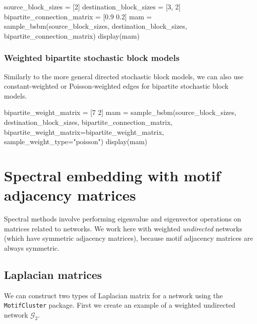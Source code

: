\documentclass{article}
\begin{document}
\begin{tcolorbox}[colback=black!5!white,colframe=black!15!white]
\begin{juliablock}
source_block_sizes = [2]
destination_block_sizes = [3, 2]
bipartite_connection_matrix = [0.9 0.2]
mam = sample_bsbm(source_block_sizes, destination_block_sizes,
                  bipartite_connection_matrix)
display(mam)
\end{juliablock}
\texttt{\obeylines\printpythontex}
\end{tcolorbox}

\subsubsection{Weighted bipartite stochastic block models}

Similarly to the more general directed stochastic block models,
we can also use constant-weighted or Poisson-weighted edges for bipartite
stochastic block models.

\begin{tcolorbox}[colback=black!5!white,colframe=black!15!white]
\begin{juliablock}
bipartite_weight_matrix = [7 2]
mam = sample_bsbm(source_block_sizes, destination_block_sizes,
                  bipartite_connection_matrix,
                  bipartite_weight_matrix=bipartite_weight_matrix,
                  sample_weight_type="poisson")
display(mam)
\end{juliablock}
\texttt{\obeylines\printpythontex}
\end{tcolorbox}




\section{Spectral embedding with motif adjacency matrices}

Spectral methods involve performing eigenvalue and
eigenvector operations on matrices related to networks.
We work here with weighted \emph{undirected} networks
(which have symmetric adjacency matrices),
because motif adjacency matrices are always symmetric.

\subsection{Laplacian matrices}

We can construct two types of Laplacian matrix for a network
using the \texttt{MotifCluster} package.
First we create an example of a weighted undirected network $\mathcal{G}_2$.
\end{document}
